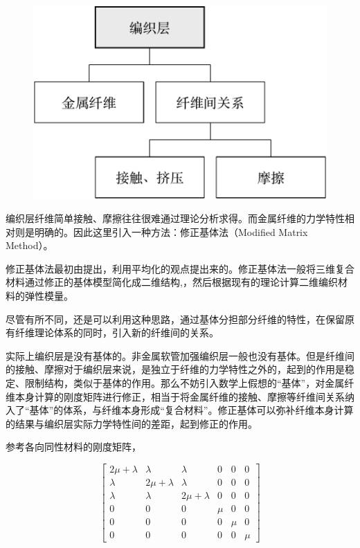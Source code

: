 \begin{figure}[!htb]
\centering
\includegraphics[height=0.2\textheight]{figure/chap5/modified-matrix-relation}
\label{fig:modified-matrix-relation}
\end{figure}

编织层纤维简单接触、摩擦往往很难通过理论分析求得。而金属纤维的力学特性相对则是明确的。因此这里引入一种方法：修正基体法（Modified Matrix Method）。

修正基体法最初由\citeauthor{modmm1978}\cite{modmm1978}提出，利用平均化的观点提出来的。修正基体法一般将三维复合材料通过修正的基体模型简化成二维结构,，然后根据现有的理论计算二维编织材料的弹性模量。

尽管有所不同，还是可以利用这种思路，通过基体分担部分纤维的特性，在保留原有纤维理论体系的同时，引入新的纤维间的关系。

实际上编织层是没有基体的。非金属软管加强编织层一般也没有基体。但是纤维间的接触、摩擦对于编织层来说，是独立于纤维的力学特性之外的，起到的作用是稳定、限制结构，类似于基体的作用。那么不妨引入数学上假想的“基体”，对金属纤维本身计算的刚度矩阵进行修正，相当于将金属纤维的接触、摩擦等纤维间关系纳入了“基体”的体系，与纤维本身形成“复合材料”。修正基体可以弥补纤维本身计算的结果与编织层实际力学特性间的差距，起到修正的作用。

参考各向同性材料的刚度矩阵，

\begin{equation}
\label{eq:common-stifness}
\left[ {\begin{array}{*{20}{c}}
{2\mu  + \lambda }&\lambda &\lambda &0&0&0\\
\lambda &{2\mu  + \lambda }&\lambda &0&0&0\\
\lambda &\lambda &{2\mu  + \lambda }&0&0&0\\
0&0&0&\mu &0&0\\
0&0&0&0&\mu &0\\
0&0&0&0&0&\mu 
\end{array}} \right]
\end{equation}

